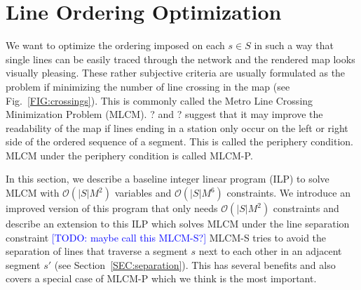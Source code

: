 \documentclass{llncs}
\newcommand\todo[1]{\textcolor{blue}{[TODO: #1]}}
\begin{document}
%
\section{Line Ordering Optimization}\label{SEC:ordering}
%
We want to optimize the ordering imposed on each $s \in S$ in such a way that single lines can be easily traced through the network and the rendered map looks visually pleasing. These rather subjective criteria are usually formulated as the problem if minimizing the number of line crossing in the map (see Fig.~\ref{FIG:crossings}). This is commonly called the Metro Line Crossing Minimization Problem (MLCM). ? and ? suggest that it may improve the readability of the map if lines ending in a station only occur on the left or right side of the ordered sequence of a segment. This is called the periphery condition. MLCM under the periphery condition is called MLCM-P.

In this section, we describe a baseline integer linear program (ILP) to solve MLCM with $\mathcal{O}(|S|M^{2})$ variables and $\mathcal{O}(|S|M^{6})$ constraints.
We introduce an improved version of this program that only needs $\mathcal{O}(|S|M^2)$ constraints and describe an extension to this ILP which solves MLCM under the line separation constraint \todo{maybe call this MLCM-S?}
MLCM-S tries to avoid the separation of lines that traverse a segment $s$ next to each other in an adjacent segment $s'$ (see Section~\ref{SEC:separation}).
This has several benefits and also covers a special case of MLCM-P which we think is the most important.

%
\end{document}
